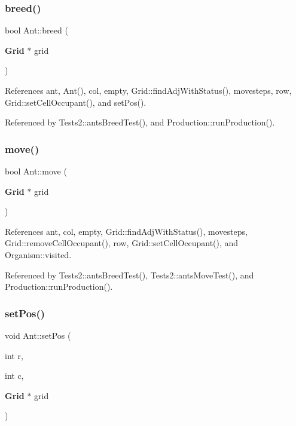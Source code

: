 \subsubsection{breed()}
{\footnotesize\ttfamily bool Ant\+::breed (\begin{DoxyParamCaption}\item[{\textbf{ Grid} $\ast$}]{grid }\end{DoxyParamCaption})}



References ant, Ant(), col, empty, Grid\+::find\+Adj\+With\+Status(), movesteps, row, Grid\+::set\+Cell\+Occupant(), and set\+Pos().



Referenced by Tests2\+::ants\+Breed\+Test(), and Production\+::run\+Production().

\mbox{\label{classAnt_a10d7a628d2459776b19d363a1fbf6dd9}} 
\subsubsection{move()}
{\footnotesize\ttfamily bool Ant\+::move (\begin{DoxyParamCaption}\item[{\textbf{ Grid} $\ast$}]{grid }\end{DoxyParamCaption})}



References ant, col, empty, Grid\+::find\+Adj\+With\+Status(), movesteps, Grid\+::remove\+Cell\+Occupant(), row, Grid\+::set\+Cell\+Occupant(), and Organism\+::visited.



Referenced by Tests2\+::ants\+Breed\+Test(), Tests2\+::ants\+Move\+Test(), and Production\+::run\+Production().

\mbox{\label{classAnt_a01098e2ff950739797f518b9fbeb3993}} 
\subsubsection{set\+Pos()}
{\footnotesize\ttfamily void Ant\+::set\+Pos (\begin{DoxyParamCaption}\item[{int}]{r,  }\item[{int}]{c,  }\item[{\textbf{ Grid} $\ast$}]{grid }\end{DoxyParamCaption})}

